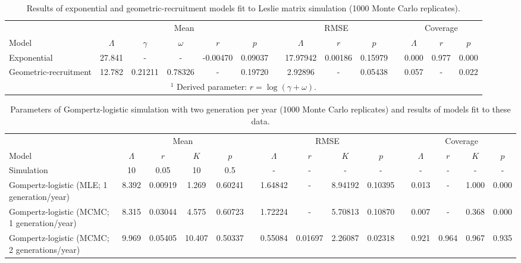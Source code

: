 \documentclass{article}
\begin{document}
\begin{landscape}
\clearpage

\begin{table}[htb]
  \centering
  \footnotesize
  \caption{Results of exponential and geometric-recruitment models fit to Leslie matrix simulation (1000 Monte Carlo replicates).}
  \begin{tabular}{lccccccccccccc}
    \hline
    & \multicolumn{5}{c}{Mean} &&
    \multicolumn{3}{c}{RMSE} &&
    \multicolumn{3}{c}{Coverage} \\
    \cline{2-6}     \cline{8-10}    \cline{12-14}
    Model & $\Lambda$ & $\gamma$ & $\omega$ & $r$\footnotemark[1] & $p$ &&
    $\Lambda$ & $r$ & $p$ && 
    $\Lambda$ & $r$ & $p$ \\
    \hline
Exponential &
27.841	&-	&- 	&-0.00470	&0.09037	&&
17.97942	&0.00186 	&0.15979	&&
0.000 		&0.977 	&0.000 \\
Geometric-recruitment &
12.782	&0.21211	&0.78326	&-	&0.19720	&&
2.92896 	&- 	&0.05438	&&
0.057		&- 	&0.022 \\
  \hline
  \multicolumn{14}{c}{$^{1}$ Derived parameter: $r = \log(\gamma + \omega)$.}
  \end{tabular}
  \label{tab:simmat}
\end{table}
\clearpage

\begin{table}[htb]
  \centering
  \footnotesize
  \caption{Parameters of Gompertz-logistic simulation with two generation per year 
(1000 Monte Carlo replicates)
  and results of models fit to these data.}
  \begin{tabular}{lcccccccccccccc}
    \hline
    & \multicolumn{4}{c}{Mean} &&
    \multicolumn{4}{c}{RMSE} &&
    \multicolumn{4}{c}{Coverage} \\
    \cline{2-5}     \cline{7-10}    \cline{12-15}
    Model & $\Lambda$ & $r$ & $K$ & $p$ &&
    $\Lambda$ & $r$ & $K$ & $p$ && 
    $\Lambda$ & $r$ & $K$ & $p$ \\
    \hline
Simulation & 
10	&0.05	&10	&0.5	&&-	&-	&-	&-	&&-	&-	&-	&-\\
Gompertz-logistic (MLE; 1 generation/year) &
8.392	&0.00919	&1.269	&0.60241	&&
1.64842	&-	&8.94192	&0.10395	&&
0.013	&-	&1.000 	&0.000 \\
Gompertz-logistic (MCMC; 1 generation/year) &
8.315	&0.03044	&4.575	&0.60723	&&
1.72224	&-	&5.70813	&0.10870	&&
0.007	&-	&0.368		&0.000 \\
Gompertz-logistic (MCMC; 2 generations/year) &
9.969	&0.05405	&10.407	&0.50337	&&
0.55084	&0.01697	&2.26087	&0.02318	&&
0.921	&0.964	&0.967	&0.935 \\
  \hline
  \end{tabular}
  \label{tab:simgomp}
\end{table}


\end{landscape}
\end{document}
